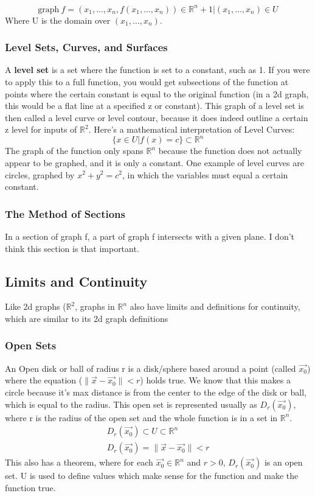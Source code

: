 \documentclass{article}
\begin{document}
\[\text{graph} \ f = {(x_1, \ldots,x_n, f(x_1,\ldots,x_n)) \in \mathbb{R}^n+1 | (x_1,\dots,x_n) \in U}\]
Where U is the domain over $(x_1, \ldots,x_n)$.

\subsubsection{Level Sets, Curves, and Surfaces}
A \textbf{level set} is a set where the function is set to a constant, such as 1.
If you were to apply this to a full function, you would get subsections of the function
at points where the certain constant is equal to the original function (in a 2d graph,
this would be a flat line at a specified z or constant). This graph of a level set
is then called a level curve or level contour, because it does indeed outline a certain
z level for inputs of $\mathbb{R}^2$.\newline
Here's a mathematical interpretation of Level Curves:
\[
  \{x \in U | f(x) = c\} \subset \mathbb{R}^n
\]
The graph of the function only spans $\mathbb{R}^n$ because the function does
not actually appear to be graphed, and it is only a constant. One example of
level curves are circles, graphed by $x^2 + y^2 = c^2$, in which the variables
must equal a certain constant.\newpage
\subsubsection{The Method of Sections}
In a section of graph f, a part of graph f intersects with a given plane. 
I don't think this section is that important.

\subsection{Limits and Continuity}
Like 2d graphs ($\mathbb{R}^2$, graphs in $\mathbb{R}^n$ also have limits
and definitions for continuity, which are similar to its 2d graph definitions
\subsubsection{Open Sets}
An Open disk or ball of radius r is a disk/sphere based around a point (called $\vec{x_0}$)
where the equation ($\lVert \vec{x} - \vec{x_0} \rVert < r$) holds true. We know
that this makes a circle because it's max distance is from the center to the edge of the
disk or ball, which is equal to the radius. This open set is represented usually as
$D_r(\vec{x_0})$, where r is the radius of the open set and the whole function is 
in a set in $\mathbb{R}^n$.
\begin{align}
  D_r(\vec{x_0}) \subset U \subset \mathbb{R}^n \\
  D_r(\vec{x_0}) = \lVert \vec{x} - \vec{x_0}\rVert < r
\end{align}
This also has a theorem, where for each $\vec{x_0} \in \mathbb{R}^n$ and $r > 0$, $D_r(\vec{x_0})$ is an open set.
U is used to define values which make sense for the function and make the function true.
\end{document}
